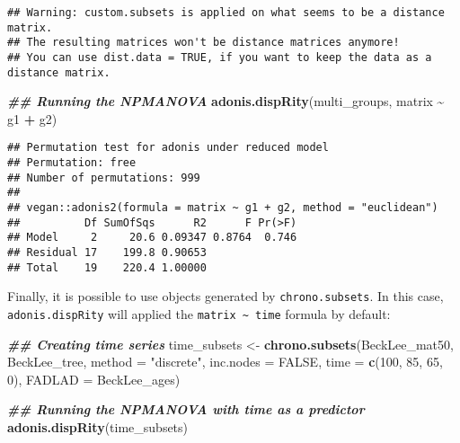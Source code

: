 \documentclass[
]{book}
\newenvironment{Shaded}{\begin{snugshade}}{\end{snugshade}}
\newcommand{\AttributeTok}[1]{\textcolor[rgb]{0.13,0.29,0.53}{#1}}
\newcommand{\ConstantTok}[1]{\textcolor[rgb]{0.56,0.35,0.01}{#1}}
\newcommand{\DecValTok}[1]{\textcolor[rgb]{0.00,0.00,0.81}{#1}}
\newcommand{\DocumentationTok}[1]{\textcolor[rgb]{0.56,0.35,0.01}{\textbf{\textit{#1}}}}
\newcommand{\FunctionTok}[1]{\textcolor[rgb]{0.13,0.29,0.53}{\textbf{#1}}}
\newcommand{\NormalTok}[1]{#1}
\newcommand{\OtherTok}[1]{\textcolor[rgb]{0.56,0.35,0.01}{#1}}
\newcommand{\SpecialCharTok}[1]{\textcolor[rgb]{0.81,0.36,0.00}{\textbf{#1}}}
\newcommand{\StringTok}[1]{\textcolor[rgb]{0.31,0.60,0.02}{#1}}
\begin{document}
\begin{verbatim}
## Warning: custom.subsets is applied on what seems to be a distance matrix.
## The resulting matrices won't be distance matrices anymore!
## You can use dist.data = TRUE, if you want to keep the data as a distance matrix.
\end{verbatim}

\begin{Shaded}
\begin{Highlighting}[]
\DocumentationTok{\#\# Running the NPMANOVA}
\FunctionTok{adonis.dispRity}\NormalTok{(multi\_groups, matrix }\SpecialCharTok{\textasciitilde{}}\NormalTok{ g1 }\SpecialCharTok{+}\NormalTok{ g2)}
\end{Highlighting}
\end{Shaded}

\begin{verbatim}
## Permutation test for adonis under reduced model
## Permutation: free
## Number of permutations: 999
## 
## vegan::adonis2(formula = matrix ~ g1 + g2, method = "euclidean")
##          Df SumOfSqs      R2      F Pr(>F)
## Model     2     20.6 0.09347 0.8764  0.746
## Residual 17    199.8 0.90653              
## Total    19    220.4 1.00000
\end{verbatim}

Finally, it is possible to use objects generated by \texttt{chrono.subsets}.
In this case, \texttt{adonis.dispRity} will applied the \texttt{matrix\ \textasciitilde{}\ time} formula by default:

\begin{Shaded}
\begin{Highlighting}[]
\DocumentationTok{\#\# Creating time series}
\NormalTok{time\_subsets }\OtherTok{\textless{}{-}} \FunctionTok{chrono.subsets}\NormalTok{(BeckLee\_mat50, BeckLee\_tree,}
                               \AttributeTok{method =} \StringTok{"discrete"}\NormalTok{,}
                               \AttributeTok{inc.nodes =} \ConstantTok{FALSE}\NormalTok{,}
                               \AttributeTok{time =} \FunctionTok{c}\NormalTok{(}\DecValTok{100}\NormalTok{, }\DecValTok{85}\NormalTok{, }\DecValTok{65}\NormalTok{, }\DecValTok{0}\NormalTok{),}
                               \AttributeTok{FADLAD =}\NormalTok{ BeckLee\_ages)}

\DocumentationTok{\#\# Running the NPMANOVA with time as a predictor}
\FunctionTok{adonis.dispRity}\NormalTok{(time\_subsets)}
\end{Highlighting}
\end{Shaded}
\end{document}

